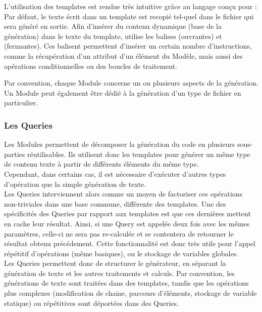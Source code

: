 L'utilisation des templates est rendue très intuitive grâce au langage conçu pour \kwacceleo{} : Par défaut, le texte écrit dans un template est recopié tel-quel dans le fichier qui sera généré en sortie. Afin d'insérer du contenu dynamique (base de la génération) dans le texte du template, \kwacceleo{} utilise les balises \guim{\textbf{[}} (ouvrantes) et \guim{\textbf{/]}} (fermantes). Ces balisent permettent d'insérer un certain nombre d'instructions, comme la récupération d'un attribut d'un élément du Modèle, mais aussi des opérations conditionnelles ou des boucles de traitement.

Par convention, chaque Module concerne un ou plusieurs aspects de la génération. Un Module peut également être dédié à la génération d'un type de fichier en particulier.



\subsubsection{Les Queries}

Les Modules permettent de décomposer la génération du code en plusieurs sous-parties réutilisables. Ils utilisent donc les templates pour générer un même type de contenu texte à partir de différents éléments du même type.\\
Cependant, dans certains cas, il est nécessaire d'exécuter d'autres types d'opération que la simple génération de texte.\\
Les Queries interviennent alors comme un moyen de factoriser ces opérations non-triviales dans une base commune, différente des templates.
Une des spécificités des Queries par rapport aux templates est que ces dernières mettent en cache leur résultat. Ainsi, si une Query est appelée deux fois avec les mêmes paramètres, celle-ci ne sera pas re-calculée et se contentera de retourner le résultat obtenu précédement. Cette fonctionnalité est donc très utile pour l'appel répétitif d'opérations (même basiques), ou le stockage de variables globales.\\
Les Queries permettent donc de structurer le générateur, en séparant la génération de texte et les autres traitements et calculs. Par convention, les générations de texte sont traitées dans des templates, tandis que les opérations plus complexes (modification de chaine, parcours d'éléments, stockage de variable statique) ou répétitives sont déportées dans des Queries.

